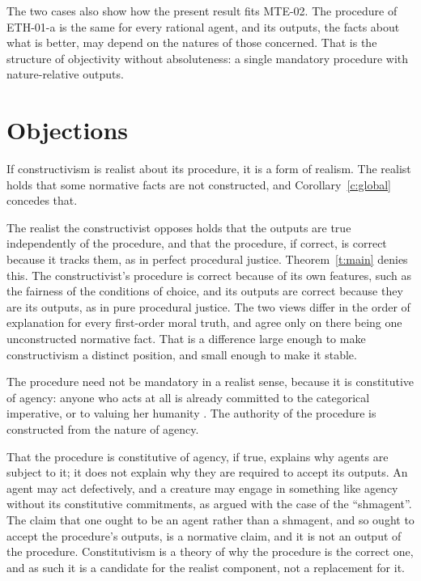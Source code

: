 \documentclass{situationist-preprint}
\begin{document}
The two cases also show how the present result fits MTE-02. The procedure of ETH-01-a is the same for every rational agent, and its outputs, the facts about what is better, may depend on the natures of those concerned. That is the structure of objectivity without absoluteness: a single mandatory procedure with nature-relative outputs.

\section{Objections}

\begin{objection}
If constructivism is realist about its procedure, it is a form of realism. The realist holds that some normative facts are not constructed, and Corollary~\ref{c:global} concedes that.
\end{objection}

\begin{reply}
The realist the constructivist opposes holds that the outputs are true independently of the procedure, and that the procedure, if correct, is correct because it tracks them, as in perfect procedural justice. Theorem~\ref{t:main} denies this. The constructivist's procedure is correct because of its own features, such as the fairness of the conditions of choice, and its outputs are correct because they are its outputs, as in pure procedural justice. The two views differ in the order of explanation for every first-order moral truth, and agree only on there being one unconstructed normative fact. That is a difference large enough to make constructivism a distinct position, and small enough to make it stable.
\end{reply}

\begin{objection}[Constitutivism]
The procedure need not be mandatory in a realist sense, because it is constitutive of agency: anyone who acts at all is already committed to the categorical imperative, or to valuing her humanity \citep{Korsgaard1996}. The authority of the procedure is constructed from the nature of agency.
\end{objection}

\begin{reply}
That the procedure is constitutive of agency, if true, explains why agents are subject to it; it does not explain why they are required to accept its outputs. An agent may act defectively, and a creature may engage in something like agency without its constitutive commitments, as \citet{Enoch2006} argued with the case of the \enquote{shmagent}. The claim that one ought to be an agent rather than a shmagent, and so ought to accept the procedure's outputs, is a normative claim, and it is not an output of the procedure. Constitutivism is a theory of why the procedure is the correct one, and as such it is a candidate for the realist component, not a replacement for it.
\end{reply}
\end{document}
